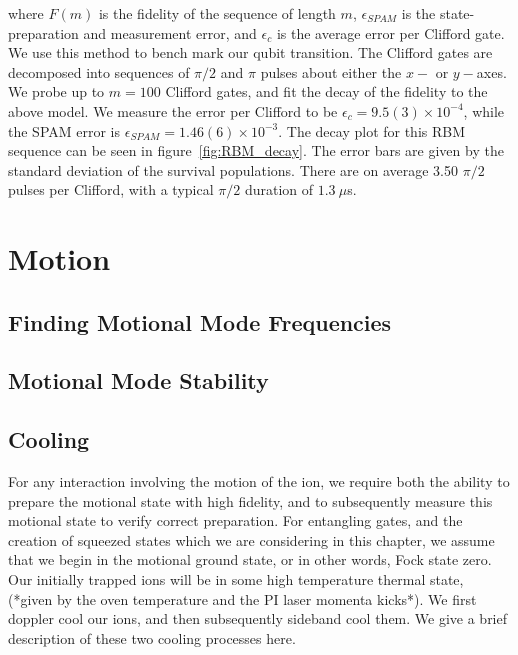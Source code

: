 \documentclass[12pt]{report}
\begin{document}
    \noindent where $F(m)$ is the fidelity of the sequence of length $m$,
    $\epsilon_{SPAM}$ is the state-preparation and measurement error, and
    $\epsilon_c$ is the average error per Clifford gate.  We use this method to
    bench mark our qubit transition. The Clifford gates are decomposed into
    sequences of $\pi/2$ and $\pi$ pulses about either the $x-$ or $y-$axes. We probe up to $m=100$ Clifford gates, and fit the decay of the fidelity to the above model.
    We measure the error per Clifford to be $\epsilon_c = 9.5(3) \times 10^{-4}$,
    while the SPAM error is $\epsilon_{SPAM} = 1.46(6) \times 10^{-3}$. The decay plot for
    this RBM sequence can be seen in figure~\ref{fig:RBM_decay}. The error bars
    are given by the standard deviation of the survival populations. There are on average 3.50 $\pi/2$ pulses per Clifford, with a typical $\pi/2$ duration of $1.3~\mu$s.\\


\section{Motion}
\label{sec:Motion}

\subsection{Finding Motional Mode Frequencies}

\subsection{Motional Mode Stability}

\subsection{Cooling}
\label{sec:Cooling}
    For any interaction involving the motion of the ion, we require both the
    ability to prepare the motional state with high fidelity, and to
    subsequently measure this motional state to verify correct preparation. For
    entangling gates, and the creation of squeezed states which we are
    considering in this chapter, we assume that we begin in the motional ground
    state, or in other words, Fock state zero.  Our initially trapped ions will
    be in some high temperature thermal state, (*given by the oven temperature
    and the PI laser momenta kicks*). We first doppler cool our ions, and then
    subsequently sideband cool them. We give a brief description of these two
    cooling processes here.\\
\end{document}

